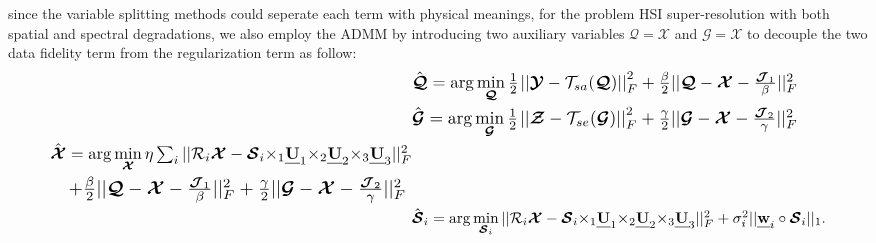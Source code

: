 \documentclass[twocolumn]{svjour3}          %
\begin{document}
    since the variable splitting methods could seperate each term with physical meanings, for the problem HSI super-resolution with both spatial and spectral degradations, we also employ the ADMM \cite{lin2011linearized} by introducing two  auxiliary variables ${\boldsymbol{\mathcal{Q}}} = {\boldsymbol{\mathcal{X}}}$ and ${\boldsymbol{\mathcal{G}}} = {\boldsymbol{\mathcal{X}}}$ to decouple the two data fidelity term from the regularization term as follow:
    \begin{subequations}
    \label{eq:omegai}
    \begin{align}
    \label{eq:SR-a}
    &\resizebox{0.8\hsize}{!}{${\hat {\boldsymbol{\mathcal{Q}}} = \arg \mathop {\min }\limits_{\boldsymbol{\mathcal{Q}}} \frac{1}{2}{\kern 1pt} {\rm{||}}{\boldsymbol{\mathcal{Y}}} - {\mathcal{T}_{sa}}({\boldsymbol{\mathcal{Q}}}){\rm{||}}_F^2 + \frac{\beta }{2}||{\boldsymbol{\mathcal{Q}}} - {\boldsymbol{\mathcal{X}}} - \frac{\boldsymbol{\mathcal{J}}_1}{\beta }||_F^2}$}\\
    \label{eq:SR-b}
    &\resizebox{0.8\hsize}{!}{${\hat {\boldsymbol{\mathcal{G}}} = \arg \mathop {\min }\limits_{\boldsymbol{\mathcal{G}}} \frac{1}{2}{\kern 1pt} {\rm{||}}{\boldsymbol{\mathcal{Z}}} - {\mathcal{T}_{se}}({\boldsymbol{\mathcal{G}}}){\rm{||}}_F^2 + \frac{\gamma }{2}||{\boldsymbol{\mathcal{G}}} - {\boldsymbol{\mathcal{X}}} - \frac{\boldsymbol{\mathcal{J}}_2}{\gamma }||_F^2}$}\\
    \begin{split}\label{eq:SR-c}
    &\resizebox{0.75\hsize}{!}{${\hat {\boldsymbol{\mathcal{X}}} =  \arg \mathop {\min }\limits_{\boldsymbol{\mathcal{X}}} \eta \sum\nolimits_i {||{{\mathcal{R}}_i}{\boldsymbol{\mathcal{X}}} - {{\boldsymbol{\mathcal{S}}}_i}{ \times _1}{\textbf{\emph{U}}_1}{ \times _2}{\textbf{\emph{U}}_2}{ \times _3}{\textbf{\emph{U}}_3}||_F^2} }$} \\
    &{\kern 1pt}{\kern 1pt}{\kern 1pt}{\kern 1pt}{\kern 1pt}{\kern 1pt}{\kern 1pt}{\kern 1pt}{\kern 1pt}{\kern 1pt}{\kern 1pt}{\kern 1pt}{\kern 1pt}\resizebox{0.7\hsize}{!}{$+ \frac{\beta }{2}||{\boldsymbol{\mathcal{Q}}} - {\boldsymbol{\mathcal{X}}} - \frac{\boldsymbol{\mathcal{J}}_1}{\beta }||_F^2 + \frac{\gamma }{2}||{\boldsymbol{\mathcal{G}}} - {\boldsymbol{\mathcal{X}}} - \frac{\boldsymbol{\mathcal{J}}_2}{\gamma }||_F^2$}
    \end{split}
    \\
    \label{eq:SR-d}
    &\resizebox{0.85\hsize}{!}{${{{\hat {\boldsymbol{\mathcal{S}}}}_i} = \arg \mathop {\min }\limits_{{{\boldsymbol{\mathcal{S}}}_i}} ||{{\mathcal{R}}_i}{\boldsymbol{\mathcal{X}}} - {{\boldsymbol{\mathcal{S}}}_i}{ \times _1}{\textbf{\emph{U}}_1}{ \times _2}{\textbf{\emph{U}}_2}{ \times _3}{\textbf{\emph{U}}_3}||_F^2 + \sigma _i^2||{\textbf{\emph{w}}_i} \circ {{\boldsymbol{\mathcal{S}}}_i}|{|_1}}$}.
    \end{align}
    \end{subequations}
\end{document}
